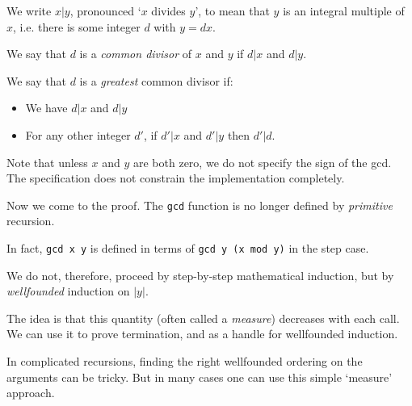 \begin{slide*}


\vspace*{0.5cm}

We write {\red $x | y$}, pronounced `{\red $x$} divides {\red $y$}', to mean
that {\red $y$} is an integral multiple of {\red $x$}, i.e. there is some
integer {\red $d$} with {\red $y = d x$}.

We say that {\red $d$} is a {\em common divisor} of {\red $x$} and {\red $y$}
if {\red $d | x$} and {\red $d | y$}.

We say that {\red $d$} is a {\em greatest} common divisor if:

\begin{itemize}

\item We have {\red $d | x$} and {\red $d | y$}

\item For any other integer {\red $d'$}, if {\red $d' | x$} and {\red $d' | y$}
then {\red $d' | d$}.

\end{itemize}

Note that unless {\red $x$} and {\red $y$} are both zero, we do not specify the
sign of the gcd. The specification does not constrain the implementation
completely.

\end{slide*}




\begin{slide*}


\vspace*{0.5cm}

Now we come to the proof. The {\black \tt gcd} function is no longer defined by
{\em primitive} recursion.

In fact, {\black \tt gcd x y} is defined in terms of {\black \tt gcd y (x mod
y)} in the step case.

We do not, therefore, proceed by step-by-step mathematical induction, but by
{\em wellfounded} induction on {\red $|y|$}.

The idea is that this quantity (often called a {\em measure}) decreases with
each call. We can use it to prove termination, and as a handle for wellfounded
induction.

In complicated recursions, finding the right wellfounded ordering on the
arguments can be tricky. But in many cases one can use this simple `measure'
approach.

\end{slide*}



